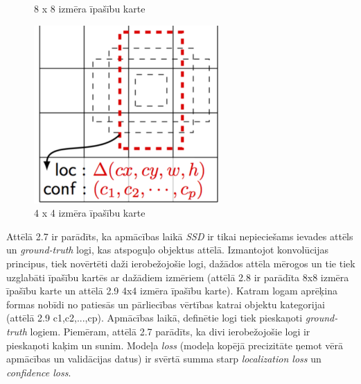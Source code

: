 \begin{figure}[!htb]
	\caption{8 x 8 izmēra īpašību karte \cite{liu2016ssd}}
	\endminipage\hfill
	\includegraphics[width=\linewidth]{images/ssd44featmap.png}
	\caption{4 x 4 izmēra īpašību karte \cite{liu2016ssd}}
	\endminipage
\end{figure}

Attēlā 2.7 ir parādīts, ka apmācības laikā \textit{SSD} ir tikai nepieciešams ievades attēls un \textit{ground-truth} logi, kas atspoguļo objektus attēlā. Izmantojot konvolūcijas principus, tiek novērtēti daži ierobežojošie logi, dažādos attēla mērogos un tie tiek uzglabāti īpašību kartēs ar dažādiem izmēriem (attēlā 2.8 ir parādīta 8x8 izmēra īpašību karte un attēlā 2.9 4x4 izmēra īpašību karte). Katram logam aprēķina formas nobīdi no patiesās un pārliecības vērtības katrai objektu kategorijai (attēlā 2.9 c1,c2,...,cp). Apmācības laikā, definētie logi tiek pieskaņoti \textit{ground-truth} logiem. Piemēram, attēlā 2.7 parādīts, ka divi ierobežojošie logi ir pieskaņoti kaķim un sunim. Modeļa \textit{loss} (modeļa kopējā precizitāte ņemot vērā apmācības un validācijas datus) ir svērtā summa starp \textit{localization loss} un \textit{confidence loss}. 


